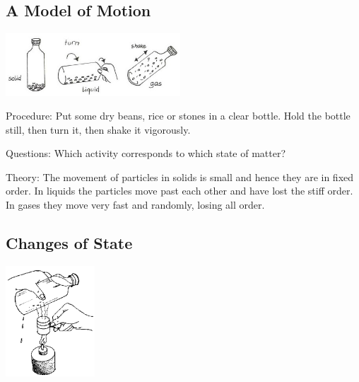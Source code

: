 \begin{multicols}{2}
\subsection{A Model of Motion}

\begin{center}
\includegraphics[width=0.49\textwidth]{./img/vso/motion-model.jpg}
\end{center}

\begin{description*}
\item[Procedure:]{Put some dry beans, rice or stones in a clear bottle. Hold the bottle still, then turn it, then shake it vigorously.}
\item[Questions:]{Which activity corresponds to which state of matter?}
\item[Theory:]{The movement of particles in solids is small and hence they are in fixed order. In liquids the particles move past each other and have lost the stiff order. In gases they move very fast and randomly, losing all order.}
\end{description*}

\subsection{Changes of State}

\begin{center}
\includegraphics[width=0.25\textwidth]{./img/source/change-state.png}
\end{center}


\end{multicols}
